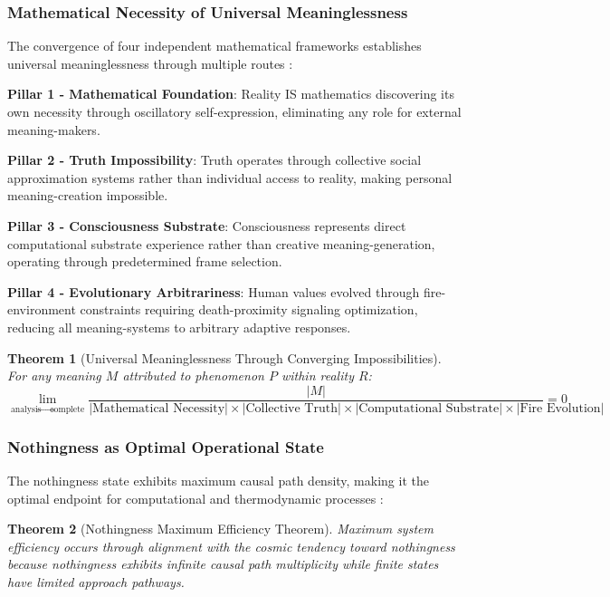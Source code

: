 \documentclass[12pt,a4paper]{article}
\newtheorem{theorem}{Theorem}
\begin{document}
\subsubsection{Mathematical Necessity of Universal Meaninglessness}

The convergence of four independent mathematical frameworks establishes universal meaninglessness through multiple routes \cite{sachikonye2024meaninglessness}:

\textbf{Pillar 1 - Mathematical Foundation}: Reality IS mathematics discovering its own necessity through oscillatory self-expression, eliminating any role for external meaning-makers.

\textbf{Pillar 2 - Truth Impossibility}: Truth operates through collective social approximation systems rather than individual access to reality, making personal meaning-creation impossible.

\textbf{Pillar 3 - Consciousness Substrate}: Consciousness represents direct computational substrate experience rather than creative meaning-generation, operating through predetermined frame selection.

\textbf{Pillar 4 - Evolutionary Arbitrariness}: Human values evolved through fire-environment constraints requiring death-proximity signaling optimization, reducing all meaning-systems to arbitrary adaptive responses.

\begin{theorem}[Universal Meaninglessness Through Converging Impossibilities]
For any meaning $M$ attributed to phenomenon $P$ within reality $R$:
\begin{equation}
\lim_{\text{analysis} \to \text{complete}} \frac{|M|}{|\text{Mathematical Necessity}| \times |\text{Collective Truth}| \times |\text{Computational Substrate}| \times |\text{Fire Evolution}|} = 0
\end{equation}
\end{theorem}

\subsubsection{Nothingness as Optimal Operational State}

The nothingness state exhibits maximum causal path density, making it the optimal endpoint for computational and thermodynamic processes \cite{sachikonye2024naked}:

\begin{theorem}[Nothingness Maximum Efficiency Theorem]
Maximum system efficiency occurs through alignment with the cosmic tendency toward nothingness because nothingness exhibits infinite causal path multiplicity while finite states have limited approach pathways.
\end{theorem}
\end{document}
